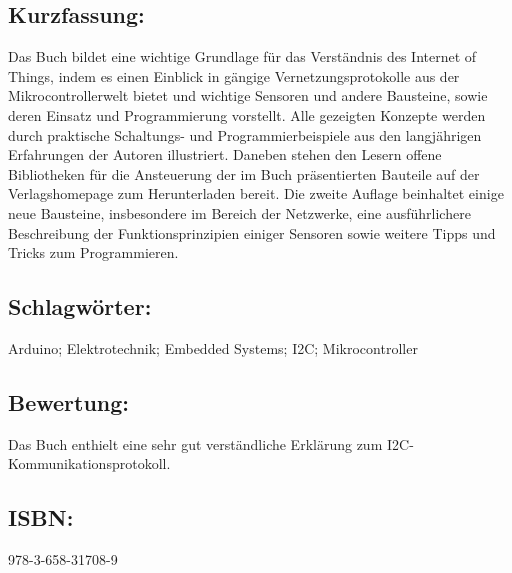 \begin{minipage}{0.48\textwidth}
\subsection*{Kurzfassung:}
Das Buch bildet eine wichtige Grundlage für das Verständnis des Internet of Things, indem es einen Einblick in gängige Vernetzungsprotokolle aus der Mikrocontrollerwelt bietet und wichtige Sensoren und andere Bausteine, sowie deren Einsatz und Programmierung vorstellt. Alle gezeigten Konzepte werden durch praktische Schaltungs- und Programmierbeispiele aus den langjährigen Erfahrungen der Autoren illustriert. Daneben stehen den Lesern offene Bibliotheken für die Ansteuerung der im Buch präsentierten Bauteile auf der Verlagshomepage zum Herunterladen bereit. Die zweite Auflage beinhaltet einige neue Bausteine, insbesondere im Bereich der Netzwerke, eine ausführlichere Beschreibung der Funktionsprinzipien einiger Sensoren sowie weitere Tipps und Tricks zum Programmieren.
\end{minipage}
\subsection*{Schlagwörter:}
Arduino; Elektrotechnik; Embedded Systems; I2C; Mikrocontroller
\subsection*{Bewertung:}
Das Buch enthielt eine sehr gut verständliche Erklärung zum I2C-Kommunikationsprotokoll.
\subsection*{ISBN:}
978-3-658-31708-9

